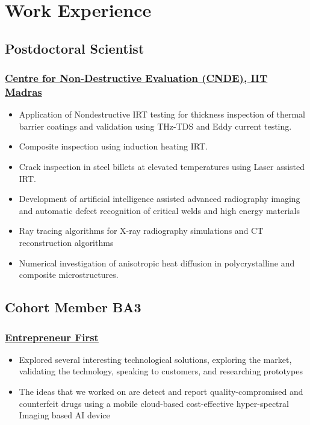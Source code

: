 \documentclass{my_cv}%
\begin{document}
\section{Work Experience}
\vspace{1.0em}
\subsection{Postdoctoral Scientist}
\subsubsection{\href{https://www.cnde.in/}{Centre for Non-Destructive Evaluation (CNDE), IIT Madras}}
\begin{itemize}[leftmargin=0.15in]
\setlength\itemsep{-0.1em}
\color{mygray}
\item Application of Nondestructive IRT testing for thickness inspection of thermal barrier coatings and validation using THz-TDS and Eddy current testing.
\item Composite inspection using induction heating IRT.
\item Crack inspection in steel billets at elevated temperatures using Laser assisted IRT.
\item Development of artificial intelligence assisted advanced radiography imaging and automatic defect recognition of critical welds and high energy materials
\item Ray tracing algorithms for X-ray radiography simulations and CT reconstruction algorithms
\item Numerical investigation of anisotropic heat diffusion in polycrystalline and composite microstructures.
\end{itemize}%
{\color{mygray1} \hdashrule[0.1ex]{18.8cm}{0.2mm}{1mm}}
\subsection{Cohort Member BA3}
\subsubsection{\href{https://www.joinef.com/}{Entrepreneur First}}
\begin{itemize}[leftmargin=0.15in]
\setlength\itemsep{-0.1em}
\color{mygray}
\item Explored several interesting technological solutions, exploring the market, validating the technology, speaking to customers, and researching prototypes
\item The ideas that we worked on are detect and report quality-compromised and counterfeit drugs using a mobile cloud-based cost-effective hyper-spectral Imaging based AI device
\end{itemize}
{\color{mygray1} \hdashrule[0.1ex]{18.8cm}{0.2mm}{1mm}}
\end{document}
